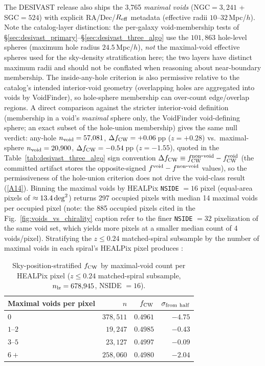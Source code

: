 \documentclass[aps,prd,twocolumn,superscriptaddress,showpacs,preprintnumbers,nofootinbib,longbibliography,floatfix]{revtex4-2}
\newcommand{\repoBase}{https://github.com/Hubify-Projects/bigbounce/blob/main}
\begin{document}
The DESIVAST release also ships the 3,765 \emph{maximal voids}
(NGC$=3{,}241$ + SGC$=524$) with explicit RA/Dec/$R_{\rm eff}$ metadata
(effective radii $10$--$32\,$Mpc/$h$). Note the catalog-layer
distinction: the per-galaxy void-membership tests of
\S\ref{sec:desivast_primary}--\S\ref{sec:desivast_three_algo} use the
$101{,}863$ hole-level spheres (maximum hole radius
$24.5\,$Mpc/$h$), \emph{not} the maximal-void effective spheres used
for the sky-density stratification here; the two layers have distinct
maximum radii and should not be conflated when reasoning about
near-boundary membership. The inside-any-hole criterion is also
permissive relative to the catalog's intended interior-void geometry
(overlapping holes are aggregated into voids by VoidFinder), so
hole-sphere membership can over-count edge/overlap regions. A direct
comparison against the stricter interior-void definition (membership
in a void's \emph{maximal} sphere only, the VoidFinder void-defining
sphere; an exact subset of the hole-union membership) gives the same
null verdict: any-hole $n_{\rm void} = 57{,}081$,
$\Delta f_{\rm CW} = +0.06$\,pp ($z = +0.28$) vs.\ maximal-sphere
$n_{\rm void} = 20{,}900$, $\Delta f_{\rm CW} = -0.54$\,pp
($z = -1.55$), quoted in the
Table~\ref{tab:desivast_three_algo} sign convention
$\Delta f_{\rm CW} \equiv f_{\rm CW}^{\rm non\mbox{-}void} -
f_{\rm CW}^{\rm void}$ (the committed artifact stores the
opposite-signed $f^{\rm void} - f^{\rm non\mbox{-}void}$ values), so
the permissiveness of the hole-union criterion does
not drive the void-class result
(\href{\repoBase/pipelines/p5\_desi\_chirality/outputs/24\_r24conf\_pod\_session.json}{[A14]}). Binning the maximal voids by
HEALPix \texttt{NSIDE} $= 16$ pixel (equal-area pixels of
$\approx 13.4\,{\rm deg}^2$) returns 297 occupied pixels with
median 14 maximal voids per occupied pixel (note: the 885 occupied pixels cited in the Fig.~\ref{fig:voids_vs_chirality} caption refer to the finer \texttt{NSIDE} $= 32$ pixelization of the same void set, which yields more pixels at a smaller median count of 4 voids/pixel). Stratifying the $z \leq
0.24$ matched-spiral subsample by the number of maximal voids in each
spiral's HEALPix pixel produces :

\begin{table}[ht]
\caption{Sky-position-stratified $f_{\rm CW}$ by maximal-void count per
HEALPix pixel ($z \leq 0.24$ matched-spiral subsample, $n_{\rm lz} =
678{,}945$, NSIDE $= 16$).}
\label{tab:maximal_void_healpix}
\begin{ruledtabular}
\begin{tabular}{lrrr}
Maximal voids per pixel & $n$ & $f_{\rm CW}$ & $\sigma_{\rm from\ half}$ \\
\hline
$0$  & $378{,}511$ & $0.4961$ & $-4.75$ \\
$1$--$2$ & $19{,}247$ & $0.4985$ & $-0.43$ \\
$3$--$5$ & $23{,}127$ & $0.4997$ & $-0.09$ \\
$6+$ & $258{,}060$ & $0.4980$ & $-2.04$ \\
\end{tabular}
\end{ruledtabular}
\end{table}
\end{document}
